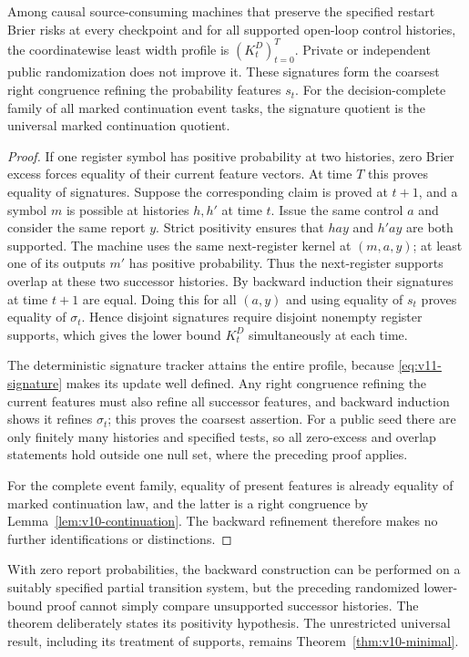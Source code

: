 \begin{theorem}
\label{thm:v11-causal-tasks}
Among causal source-consuming machines that preserve the specified
restart Brier risks at every checkpoint and for all supported open-loop
control histories, the coordinatewise least width profile is
$(K_t^D)_{t=0}^T$. Private or independent public randomization does not
improve it. These signatures form the coarsest right congruence refining
the probability features $s_t$. For the decision-complete family of all
marked continuation event tasks, the signature quotient is the universal
marked continuation quotient.
\end{theorem}

\begin{proof}
If one register symbol has positive probability at two histories, zero
Brier excess forces equality of their current feature vectors. At time
$T$ this proves equality of signatures. Suppose the corresponding claim
is proved at $t+1$, and a symbol $m$ is possible at histories $h,h'$ at
time $t$. Issue the same control $a$ and consider the same report $y$.
Strict positivity ensures that $hay$ and $h'ay$ are both supported. The
machine uses the same next-register kernel at $(m,a,y)$; at least one of
its outputs $m'$ has positive probability. Thus the next-register
supports overlap at these two successor histories. By backward
induction their signatures at time $t+1$ are equal. Doing this for all
$(a,y)$ and using equality of $s_t$ proves equality of $\sigma_t$.
Hence disjoint signatures require disjoint nonempty register supports,
which gives the lower bound $K_t^D$ simultaneously at each time.

The deterministic signature tracker attains the entire profile, because
\eqref{eq:v11-signature} makes its update well defined. Any right
congruence refining the current features must also refine all successor
features, and backward induction shows it refines $\sigma_t$; this proves
the coarsest assertion. For a public seed there are only finitely many
histories and specified tests, so all zero-excess and overlap statements
hold outside one null set, where the preceding proof applies.

For the complete event family, equality of present features is already
equality of marked continuation law, and the latter is a right congruence
by Lemma~\ref{lem:v10-continuation}. The backward refinement therefore
makes no further identifications or distinctions.
\end{proof}

\begin{remark}
With zero report probabilities, the backward construction can be performed
on a suitably specified partial transition system, but the preceding
randomized lower-bound proof cannot simply compare unsupported successor
histories. The theorem deliberately states its positivity hypothesis.
The unrestricted universal result, including its treatment of supports,
remains Theorem~\ref{thm:v10-minimal}.
\end{remark}
